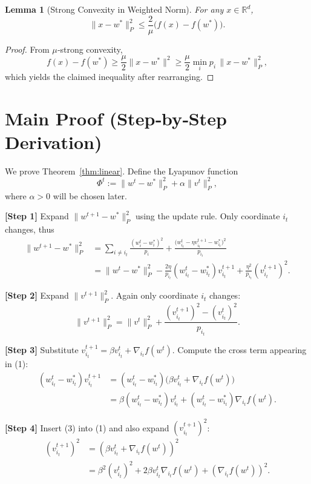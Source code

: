 \documentclass{article}
\newcommand{\R}{\mathbb{R}}
\newtheorem{lemma}{Lemma}
\begin{document}
\begin{lemma}[Strong Convexity in Weighted Norm]\label{lem:sc}
For any $x\in\R^{d}$,
\[
\|x-w^{*}\|_{P}^{2}\le \frac{2}{\mu}\bigl(f(x)-f(w^{*})\bigr).
\]
\end{lemma}
\begin{proof}
From $\mu$‑strong convexity,
\[
f(x)-f(w^{*})\ge \frac{\mu}{2}\|x-w^{*}\|^{2}\ge
\frac{\mu}{2}\min_i p_i \,\|x-w^{*}\|_{P}^{2},
\]
which yields the claimed inequality after rearranging.
\end{proof}

\section*{Main Proof (Step‑by‑Step Derivation)}
We prove Theorem~\ref{thm:linear}.  
Define the Lyapunov function
\[
\Phi^{t}:=\|w^{t}-w^{*}\|_{P}^{2}+\alpha\|v^{t}\|_{P}^{2},
\]
where $\alpha>0$ will be chosen later.

\noindent\textbf{[Step 1]} Expand $\|w^{t+1}-w^{*}\|_{P}^{2}$ using the update rule.  
Only coordinate $i_t$ changes, thus
\[
\begin{aligned}
\|w^{t+1}-w^{*}\|_{P}^{2}
&= \sum_{i\neq i_t}\frac{(w^{t}_i-w^{*}_i)^{2}}{p_i}
   +\frac{\bigl(w^{t}_{i_t}-\eta v^{t+1}_{i_t}-w^{*}_{i_t}\bigr)^{2}}{p_{i_t}}\\
&= \|w^{t}-w^{*}\|_{P}^{2}
   -\frac{2\eta}{p_{i_t}}(w^{t}_{i_t}-w^{*}_{i_t})v^{t+1}_{i_t}
   +\frac{\eta^{2}}{p_{i_t}}(v^{t+1}_{i_t})^{2}.
\end{aligned}
\tag{1}
\]

\noindent\textbf{[Step 2]} Expand $\|v^{t+1}\|_{P}^{2}$.  
Again only coordinate $i_t$ changes:
\[
\|v^{t+1}\|_{P}^{2}
= \|v^{t}\|_{P}^{2}
   +\frac{(v^{t+1}_{i_t})^{2}-(v^{t}_{i_t})^{2}}{p_{i_t}} .
\tag{2}
\]

\noindent\textbf{[Step 3]} Substitute $v^{t+1}_{i_t}= \beta v^{t}_{i_t}+ \nabla_{i_t}f(w^{t})$.
Compute the cross term appearing in (1):
\[
\begin{aligned}
(w^{t}_{i_t}-w^{*}_{i_t})v^{t+1}_{i_t}
&= (w^{t}_{i_t}-w^{*}_{i_t})\bigl(\beta v^{t}_{i_t}+ \nabla_{i_t}f(w^{t})\bigr)\\
&= \beta (w^{t}_{i_t}-w^{*}_{i_t})v^{t}_{i_t}
   +(w^{t}_{i_t}-w^{*}_{i_t})\nabla_{i_t}f(w^{t}).
\end{aligned}
\tag{3}
\]

\noindent\textbf{[Step 4]} Insert (3) into (1) and also expand $(v^{t+1}_{i_t})^{2}$:
\[
\begin{aligned}
(v^{t+1}_{i_t})^{2}
&= (\beta v^{t}_{i_t}+ \nabla_{i_t}f(w^{t}))^{2}\\
&= \beta^{2}(v^{t}_{i_t})^{2}+2\beta v^{t}_{i_t}\nabla_{i_t}f(w^{t})
   +(\nabla_{i_t}f(w^{t}))^{2}.
\end{aligned}
\tag{4}
\]
\end{document}
